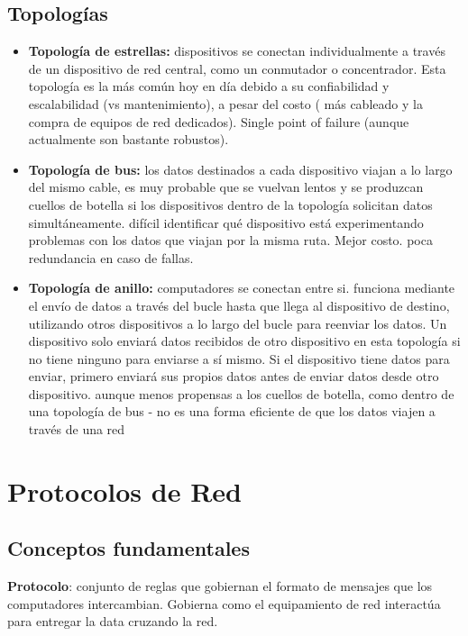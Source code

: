 \subsection{Topologías}
\begin{itemize}
    \item \textbf{Topología de estrellas:} dispositivos se conectan individualmente a través de un dispositivo de red central, como un conmutador o concentrador. Esta topología es la más común hoy en día debido a su confiabilidad y escalabilidad (vs mantenimiento), a pesar del costo ( más cableado y la compra de equipos de red dedicados). Single point of failure (aunque actualmente son bastante robustos). 
    \item \textbf{Topología de bus: } los datos destinados a cada dispositivo viajan a lo largo del mismo cable, es muy probable que se vuelvan lentos y se produzcan cuellos de botella si los dispositivos dentro de la topología solicitan datos simultáneamente. difícil identificar qué dispositivo está experimentando problemas con los datos que viajan por la misma ruta. Mejor costo. poca redundancia en caso de fallas. 
    \item \textbf{Topología de anillo: } computadores se conectan entre si.  funciona mediante el envío de datos a través del bucle hasta que llega al dispositivo de destino, utilizando otros dispositivos a lo largo del bucle para reenviar los datos. Un dispositivo solo enviará datos recibidos de otro dispositivo en esta topología si no tiene ninguno para enviarse a sí mismo. Si el dispositivo tiene datos para enviar, primero enviará sus propios datos antes de enviar datos desde otro dispositivo. aunque  menos propensas a los cuellos de botella, como dentro de una topología de bus - no es una forma eficiente de que los datos viajen a través de una red
\end{itemize}


\section{Protocolos de Red}

\subsection{Conceptos fundamentales}

\textbf{Protocolo}: conjunto de reglas que gobiernan el formato de mensajes que los computadores intercambian. Gobierna como el equipamiento de red interactúa para entregar la data cruzando la red.

